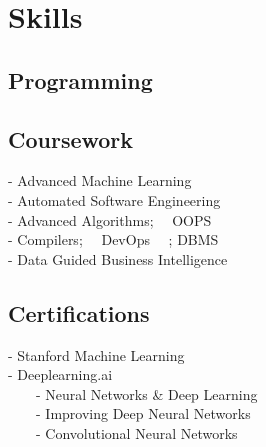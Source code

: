 \documentclass[]{bigfatnoob-resume}
\begin{document}
\begin{minipage}[t]{0.33\textwidth}

\section{Skills}
\subsection{Programming}

\sectionsep


\subsection{Coursework}
- Advanced Machine Learning \\
- Automated Software Engineering \\
- Advanced Algorithms; \ \  OOPS \\
- Compilers; \ \  DevOps \ \ ; DBMS \\  
- Data Guided Business Intelligence\\
\sectionsep


\subsection{Certifications}
- Stanford Machine Learning \\
- Deeplearning.ai \\
\ \ \ \ - Neural Networks \& Deep Learning \\
\ \ \ \ - Improving Deep Neural Networks \\
\ \ \ \ - Convolutional Neural Networks \\
\sectionsep


\end{minipage}
\end{document}
